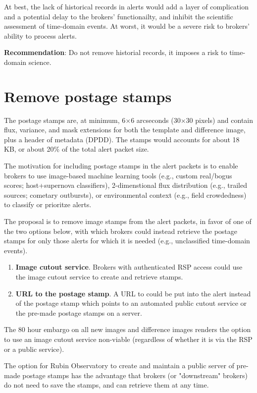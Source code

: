 \documentclass[DM,authoryear,toc]{lsstdoc}
\begin{document}
At best, the lack of historical records in alerts would add a layer of complication and a potential delay to the brokers' functionailty, and inhibit the scientific assessment of time-domain events.
At worst, it would be a severe risk to brokers' ability to process alerts.

\textbf{Recommendation}: Do not remove historial records, it imposes a risk to time-domain science.


\section{Remove postage stamps}\label{sec:stamps}

The postage stamps are, at minimum, 6$\times$6 arcseconds (30$\times$30 pixels) and contain flux, variance, and mask extensions for both the template and difference image, plus a header of metadata (DPDD).
The stamps would accounts for about 18 KB, or about 20\% of the total alert packet size.

The motivation for including postage stamps in the alert packets is to enable brokers to use image-based machine learning tools (e.g., custom real/bogus scores; host+supernova classifiers), 2-dimenstional flux distribution (e.g., trailed sources; cometary outbursts), or environmental context (e.g., field crowdedness) to classify or prioritze alerts.

The proposal is to remove image stamps from the alert packets, in favor of one of the two options below, with which brokers could instead retrieve the postage stamps for only those alerts for which it is needed (e.g., unclassified time-domain events).

\begin{enumerate}
\item \textbf{Image cutout service}. Brokers with authenticated RSP access could use the image cutout service to create and retrieve stamps.
\item \textbf{URL to the postage stamp}. A URL to could be put into the alert instead of the postage stamp which points to an automated public cutout service or the pre-made postage stamps on a server.
\end{enumerate}

The 80 hour embargo on all new images and difference images renders the option to use an image cutout service non-viable (regardless of whether it is via the RSP or a public service).

The option for Rubin Observatory to create and maintain a public server of pre-made postage stamps has the advantage that brokers (or "downstream" brokers) do not need to save the stamps, and can retrieve them at any time.
\end{document}
